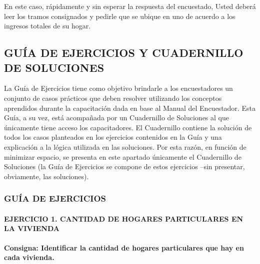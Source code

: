 \documentclass[
  openany]{book}
\begin{document}
En este caso, rápidamente y sin esperar la respuesta del encuestado, Usted deberá leer los tramos consignados y pedirle que se ubique en uno de acuerdo a los ingresos totales de su hogar.

\hypertarget{guuxeda-de-ejercicios-y-cuadernillo-de-soluciones}{%
\subsection{\texorpdfstring{\textbf{GUÍA DE EJERCICIOS Y CUADERNILLO DE SOLUCIONES}}{GUÍA DE EJERCICIOS Y CUADERNILLO DE SOLUCIONES}}\label{guuxeda-de-ejercicios-y-cuadernillo-de-soluciones}}

La Guía de Ejercicios tiene como objetivo brindarle a los encuestadores un conjunto de casos prácticos que deben resolver utilizando los conceptos aprendidos durante la capacitación dada en base al Manual del Encuestador. Esta Guía, a su vez, está acompañada por un Cuadernillo de Soluciones al que únicamente tiene acceso los capacitadores. El Cuadernillo contiene la solución de todos los casos planteados en los ejercicios contenidos en la Guía y una explicación a la lógica utilizada en las soluciones. Por esta razón, en función de minimizar espacio, se presenta en este apartado únicamente el Cuadernillo de Soluciones (la Guía de Ejercicios se compone de estos ejercicios --sin presentar, obviamente, las soluciones).

\hypertarget{guuxeda-de-ejercicios}{%
\subsubsection{\texorpdfstring{\textbf{GUÍA DE EJERCICIOS}}{GUÍA DE EJERCICIOS}}\label{guuxeda-de-ejercicios}}

\hypertarget{ejercicio-1.-cantidad-de-hogares-particulares-en-la-vivienda}{%
\paragraph{\texorpdfstring{\textbf{EJERCICIO 1. CANTIDAD DE HOGARES PARTICULARES EN LA VIVIENDA}}{EJERCICIO 1. CANTIDAD DE HOGARES PARTICULARES EN LA VIVIENDA}}\label{ejercicio-1.-cantidad-de-hogares-particulares-en-la-vivienda}}

\textbf{Consigna: Identificar la cantidad de hogares particulares que hay en cada vivienda.}
\end{document}
